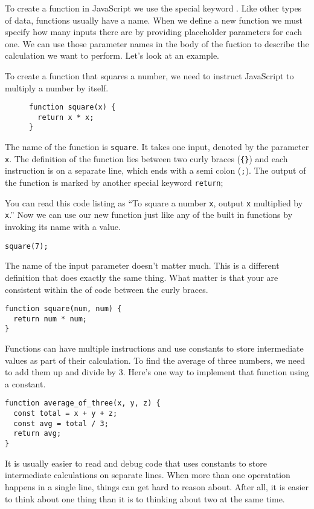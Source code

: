 \documentclass{amsart}
\begin{document}
To create a function in JavaScript we use the special keyword {}. Like other types of data, functions usually have a name. When we define a new function we must specify how many inputs there are by providing placeholder parameters for each one. We can use those parameter names in the body of the fuction to describe the calculation we want to perform. Let's look at an example.

To create a function that squares a number, we need to instruct JavaScript to multiply a number by itself.

\begin{figure}[h]
\begin{lstlisting}
function square(x) {
  return x * x;
}
\end{lstlisting}
\end{figure}

The name of the function is \texttt{square}. It takes one input, denoted by the parameter \texttt{x}. The definition of the function lies between two curly braces (\texttt{\{\}}) and each instruction is on a separate line, which ends with a semi colon (\texttt{;}). The output of the function is marked by another special keyword {\color{cyan}\texttt{return}};

You can read this code listing as ``To square a number \texttt{x}, output \texttt{x} multiplied by \texttt{x}.'' Now we can use our new function just like any of the built in functions by invoking its name with a value.

\begin{lstlisting}
square(7);
\end{lstlisting}

The name of the input parameter doesn't matter much. This is a different definition that does exactly the same thing. What matter is that your are consistent within the  of code between the curly braces.

\begin{lstlisting}
function square(num, num) {
  return num * num;
}
\end{lstlisting}

Functions can have multiple instructions and use constants to store intermediate values as part of their calculation. To find the average of three numbers, we need to add them up and divide by 3. Here's one way to implement that function using a constant.

\begin{lstlisting}
function average_of_three(x, y, z) {
  const total = x + y + z;
  const avg = total / 3;
  return avg;
}
\end{lstlisting}

It is usually easier to read and debug code that uses constants to store intermediate calculations on separate lines. When more than one operatation happens in a single line, things can get hard to reason about. After all, it is easier to think about one thing than it is to thinking about two at the same time.
\end{document}
